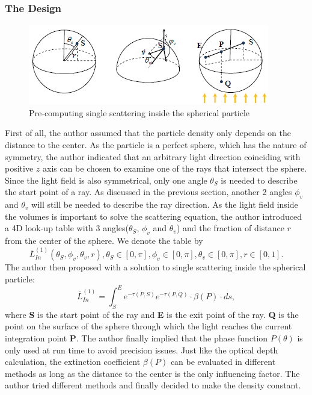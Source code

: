\subsubsection{The Design}
\begin{figure}[htp]
\begin{center}
\includegraphics[scale=1.0]{images/singlescattering.png}
\caption{Pre-computing single scattering inside the spherical
particle}
\label{f11}
\end{center}
\end{figure}
First of all, the author assumed that the particle density only depends on the distance to the center. As the particle is a perfect sphere, which has the nature of symmetry, the author indicated that an arbitrary light direction coinciding with positive $z$ axis can be chosen to examine one of the rays that intersect the sphere. Since the light field is also symmetrical, only one angle $\theta_S$ is needed to describe the start point of a ray. As discussed in the previous section, another 2 angles $\phi_v$ and $\theta_v$ will still be needed to describe the ray direction. As the light field inside the volumes is important to solve the scattering equation, the author introduced a 4D look-up table with 3 angles($\theta_S$, $\phi_v$ and $\theta_v$) and the fraction of distance $r$ from the center of the sphere. We denote the table by 
\begin{equation}
\overline{L}^{(1)}_{In}(\theta_S, \phi_v, \theta_v, r), \theta_S\in[0, \pi], \phi_v\in[0, \pi], \theta_v\in[0, \pi], r\in[0, 1].
\end{equation}
The author then proposed with a solution to single scattering inside the spherical particle:
\begin{equation}
\overline{L}^{(1)}_{In} = \int_{S}^{E}e^{-\tau(P,S)}e^{-\tau(P,Q)} \cdot \beta(P) \cdot ds,
\end{equation}
where \textbf{S} is the start point of the ray and \textbf{E} is the exit point of the ray. \textbf{Q} is the point on the surface of the sphere through which the light reaches the current integration point \textbf{P}. The author finally implied that the phase function $P(\theta)$ is only used at run time to avoid precision issues. Just like the optical depth calculation, the extinction coefficient $\beta(P)$ can be evaluated in different methods as long as the distance to the center is the only influencing factor. The author tried different methods and finally decided to make the density constant.

